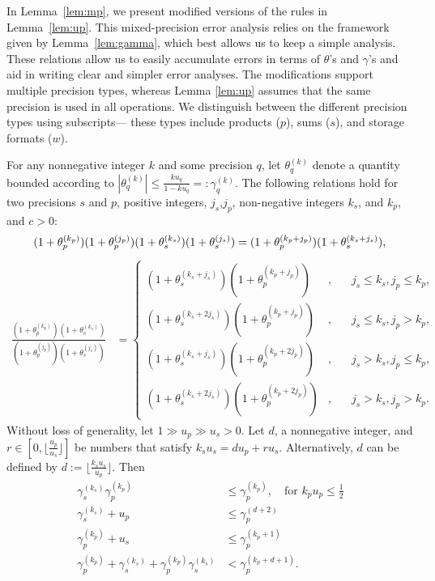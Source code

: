 \documentclass[review,onefignum,onetabnum]{siamart190516}
\newcommand{\tth}{\theta}
\begin{document}
In Lemma~\ref{lem:mp}, we present modified versions of the rules in Lemma~\ref{lem:up}.
This mixed-precision error analysis relies on the framework given by Lemma~\ref{lem:gamma}, which best allows us to keep a simple analysis. 
These relations allow us to easily accumulate errors in terms of $\tth$'s and $\gamma$'s and aid in writing clear and simpler error analyses.
The modifications support multiple precision types, whereas Lemma \ref{lem:up} assumes that the same precision is used in all operations. 
We distinguish between the different precision types using subscripts--- these types include products ($p$), sums ($s$), and storage formats ($w$).

\begin{lemma}%
	\label{lem:mp}
	For any nonnegative integer $k$ and some precision $q$, let $\tth_{q}^{(k)}$ denote a quantity bounded according to $|\tth_q^{(k)}|\leq \frac{k u_q }{1-ku_q} =:\gamma_{q}^{(k)}$.
	The following relations hold for two precisions $s$ and $p$, positive integers, $j_s$,$j_p$, non-negative integers $k_s$, and $k_p$, and $c>0$:
	\begin{equation}
	(1+\tth_{p}^{(k_p)})(1+\tth_{p}^{(j_p)})(1+\tth_{s}^{(k_s)})(1+\tth_{s}^{(j_s)})=(1+\tth_{p}^{(k_p+j_p)})(1+\tth_{s}^{(k_s+j_s)}), \\
	\end{equation}
	\begin{align}
	\frac{(1+\tth_{p}^{(k_p)})(1+\tth_{s}^{(k_s)})}{(1+\tth_{p}^{(j_p)})(1+\tth_{s}^{(j_s)})} &=\left\{\begin{alignedat}{2}
	(1+\tth_{s}^{(k_s+j_s)})(1+\tth_{p}^{(k_p+j_p)})&,\quad& j_s \leq k_s, j_p \leq k_p,\\
	(1+\tth_{s}^{(k_s+2j_s)})(1+\tth_{p}^{(k_p+j_p)})&,\quad& j_s \leq k_s, j_p > k_p,\\
	(1+\tth_{s}^{(k_s+j_s)})(1+\tth_{p}^{(k_p+2j_p)})&,\quad& j_s > k_s, j_p \leq k_p,\\
	(1+\tth_{s}^{(k_s+2j_s)})(1+\tth_{p}^{(k_p+2j_p)})&,\quad& j_s > k_s, j_p > k_p.
	\end{alignedat}\right.
	\end{align}
	Without loss of generality, let $1 \gg u_p \gg u_s>0$.
	Let $d$, a nonnegative integer, and $r\in[0, \lfloor\frac{u_p}{u_s}\rfloor]$ be numbers that satisfy $k_su_s = d u_p + r u_s$. 
	Alternatively, $d$ can be defined by $d := \lfloor\frac{k_su_s}{u_p}\rfloor$.
	Then
	\begin{align}
	\gamma_{s}^{(k_s)}\gamma_{p}^{(k_p)} &\leq \gamma_{p}^{(k_p)}, \quad\text{for } k_p u_p \leq \frac{1}{2}  \\
	\gamma_{s}^{(k_s)}+u_p &\leq \gamma_{p}^{(d+2)} \\
	\gamma_{p}^{(k_p)} + u_{s} &\leq \gamma_{p}^{(k_p+1)} \\ %
	\gamma_{p}^{(k_p)}+\gamma_{s}^{(k_s)}+\gamma_{p}^{(k_p)}\gamma_{s}^{(k_s)} & < \gamma_{p}^{(k_p+ d+ 1)}. \label{lem:mp1}
	\end{align} 
\end{lemma}
\end{document}
